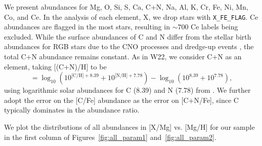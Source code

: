 \documentclass[modern, linenumbers]{aastex631}
\begin{document}
We present abundances for Mg, O, Si, S, Ca, C+N, Na, Al, K, Cr, Fe, Ni, Mn, Co, and Ce. In the analysis of each element, X, we drop stars with \texttt{X\_FE\_FLAG}. Ce abundances are flagged in the most stars, resulting in $\sim 700$ Ce labels being excluded. While the surface abundances of C and N differ from the stellar birth abundances for RGB stars due to the CNO processes and dredge-up events \citep{iben1965, shetrone2019}, the total C+N abundance remains constant. As in W22, we consider C+N as an element, taking [(C+N)/H] to be 
\begin{equation}
    [\text{C+N}/\text{H}] = \log_{10}(10^{\text{[C/H]}+8.39} + 10^{\text{[N/H]}+7.78}) - \log_{10}(10^{8.39} + 10^{7.78}),
\end{equation}
using logarithmic solar abundances for C (8.39) and N (7.78) from \citet{grevesse2007}. We further adopt the error on the [C/Fe] abundance as the error on [C+N/Fe], since C typically dominates in the abundance ratio.

We plot the distributions of all abundances in [X/Mg] vs. [Mg/H] for our sample in the first column of Figures~\ref{fig:all_param1} and~\ref{fig:all_param2}. 
\end{document}
